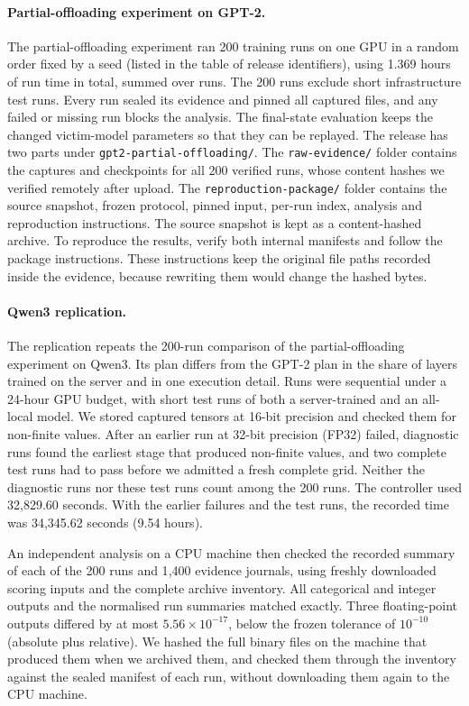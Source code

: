 \documentclass[11pt]{article}
\begin{document}
\paragraph{Partial-offloading experiment on GPT-2.}
The partial-offloading experiment ran 200 training runs on one GPU in a random order fixed by a seed (listed in the table of release identifiers), using 1.369 hours of run time in total, summed over runs. The 200 runs exclude short infrastructure test runs. Every run sealed its evidence and pinned all captured files, and any failed or missing run blocks the analysis. The final-state evaluation keeps the changed victim-model parameters so that they can be replayed. The release has two parts under \nolinkurl{gpt2-partial-offloading/}. The \nolinkurl{raw-evidence/} folder contains the captures and checkpoints for all 200 verified runs, whose content hashes we verified remotely after upload. The \nolinkurl{reproduction-package/} folder contains the source snapshot, frozen protocol, pinned input, per-run index, analysis and reproduction instructions. The source snapshot is kept as a content-hashed archive. To reproduce the results, verify both internal manifests and follow the package instructions. These instructions keep the original file paths recorded inside the evidence, because rewriting them would change the hashed bytes.

\paragraph{Qwen3 replication.}
The replication repeats the 200-run comparison of the partial-offloading experiment on Qwen3. Its plan differs from the GPT-2 plan in the share of layers trained on the server and in one execution detail. Runs were sequential under a 24-hour GPU budget, with short test runs of both a server-trained and an all-local model. We stored captured tensors at 16-bit precision and checked them for non-finite values. After an earlier run at 32-bit precision (FP32) failed, diagnostic runs found the earliest stage that produced non-finite values, and two complete test runs had to pass before we admitted a fresh complete grid. Neither the diagnostic runs nor these test runs count among the 200 runs. The controller used 32{,}829.60 seconds. With the earlier failures and the test runs, the recorded time was 34{,}345.62 seconds (9.54 hours).

An independent analysis on a CPU machine then checked the recorded summary of each of the 200 runs and 1{,}400 evidence journals, using freshly downloaded scoring inputs and the complete archive inventory. All categorical and integer outputs and the normalised run summaries matched exactly. Three floating-point outputs differed by at most $5.56\times10^{-17}$, below the frozen tolerance of $10^{-10}$ (absolute plus relative). We hashed the full binary files on the machine that produced them when we archived them, and checked them through the inventory against the sealed manifest of each run, without downloading them again to the CPU machine.
\end{document}
